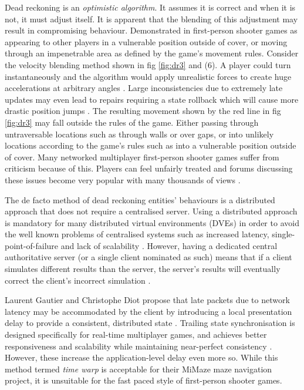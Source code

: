 \documentclass[journal]{IEEEtran}
\begin{document}
Dead reckoning is an \textit{optimistic algorithm}. It assumes it is correct  and when it is not, it must adjust itself. It is apparent that the blending of this adjustment may result in compromising behaviour. Demonstrated in first-person shooter games as appearing to other players in a vulnerable position outside of cover, or moving through an impenetrable area as defined by the game's movement rules. Consider the velocity blending method shown in fig \ref{fig:dr3} and (6). A player could turn instantaneously and the algorithm would apply unrealistic forces to create huge accelerations at arbitrary angles \cite{bernier2001latency}. Large inconsistencies due to extremely late updates may even lead to repairs requiring a state rollback which will cause more drastic position jumps \cite{cronin2002efficient}. The resulting movement shown by the red line in fig \ref{fig:dr3} may fall outside the rules of the game. Either passing through untraversable locations such as through walls or over gaps, or into unlikely locations according to the game's rules such as into a vulnerable position outside of cover. Many networked multiplayer first-person shooter games suffer from criticism because of this. Players can feel unfairly treated and forums discussing these issues become very popular with many thousands of views \cite{rout2013youtube} \cite{gkac2014gamefaqs} \cite{drift0r2013youtube} \cite{solaire2016reddit} \cite{ss2018reddit} \cite{hp2015bungie}.

The de facto method of dead reckoning entities' behaviours is a distributed approach that does not require a centralised server. Using a distributed approach is mandatory for many distributed virtual environments (DVEs) in order to avoid the well known problems of centralised systems such as increased latency, single-point-of-failure and lack of scalability \cite{mauve2000keep}. However, having a dedicated central authoritative server (or a single client nominated as such) means that if a client simulates different results than the server, the server’s results will eventually correct the client’s incorrect simulation \cite{bernier2001latency}.

Laurent Gautier and Christophe Diot propose that late packets due to network latency may be accommodated by the client by introducing a local presentation delay to provide a consistent, distributed state \cite{gautier1998design}. Trailing state synchronisation is designed specifically for real-time multiplayer games, and achieves better responsiveness and scalability while maintaining near-perfect consistency \cite{cronin2001distributed}. However, these increase the application-level delay even more so. While this method termed \textit{time warp} is acceptable for their MiMaze maze navigation project, it is unsuitable for the fast paced style of first-person shooter games.
\end{document}
